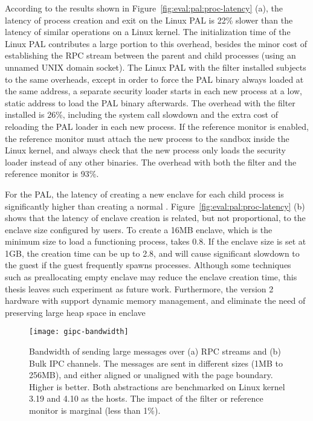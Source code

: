 According to the results shown in
Figure~\ref{fig:eval:pal:proc-latency} (a),
the latency of process creation and exit
on the Linux PAL
is \roughly{}22\% slower than
the latency of similar operations
on a Linux kernel.
The initialization time of the Linux PAL
contributes a large portion to this overhead, besides the minor cost of establishing the RPC stream
between the parent and child processes (using an unnamed UNIX domain socket).
The Linux PAL
with the \seccomp{} filter installed
subjects to the same overheads,
except in order to force the PAL binary always loaded
at the same address,
a separate security loader starts
in each new process
at a low, static address
to load the PAL binary afterwards. 
The overhead with the \seccomp{} filter installed
is \roughly{}26\%,
including the system call slowdown
and the extra cost of reloading the PAL loader in each new process.
If the reference monitor
is enabled,
the reference monitor
must attach the new process to the sandbox
inside the Linux kernel,
and always check that the new process only loads the security loader instead of any other binaries.
The overhead with both the \seccomp{} filter
and the reference monitor
is \roughly{}93\%.



For the \sgx{} PAL,
the latency of creating a new enclave for each child process
is significantly higher
than creating a normal \picoproc{}.
Figure~\ref{fig:eval:pal:proc-latency} (b)
shows that the latency of enclave creation
is related, but not proportional,
to the enclave size configured by users.
To create a 16MB enclave,
which is the minimum size to load a functioning \graphene{} process,
takes \roughly{}0.8\asec{}.
If the enclave size is set at 1GB, the creation time can be up to \roughly{}2.8\asec{},
and will cause significant slowdown
to the guest if the guest frequently spawns processes.
Although some techniques such as
preallocating empty enclave may reduce
the enclave creation time,
this thesis leaves such experiment as future work.
Furthermore,
the \sgx{} version 2 hardware
with support dynamic memory management,
and eliminate the need of preserving large heap space in enclave






 








\begin{figure*}[t!]
\centering
\footnotesize
\texttt{[image: gipc-bandwidth]}
\caption{Bandwidth of sending large messages over (a) RPC streams and (b) Bulk IPC channels. The messages are sent in different sizes (1MB to 256MB), and either aligned or unaligned with the page boundary.
Higher is better. Both abstractions are benchmarked on Linux kernel 3.19 and 4.10 as the hosts. The impact of the \seccomp{} filter or reference monitor is marginal (less than 1\%).}
\label{fig:eval:pal:gipc-bandwidth}
\end{figure*}


